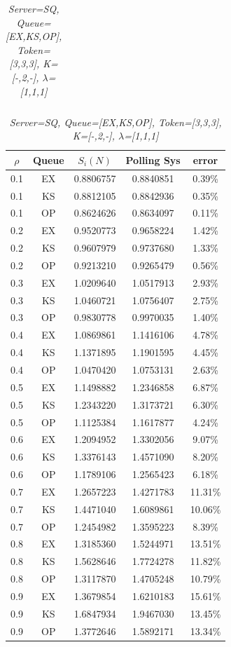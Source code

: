 \documentclass[12pt,a4paper,italian]{article}
\begin{document}
\begin{table}[h!]
\begin{minipage}[b]{0.48\linewidth}
\begin{tabular}{c c c c c}
		\end{tabular}
	\end{minipage}
	\hspace{0.5cm}
	\begin{minipage}[b]{0.48\linewidth}
		\centering
		\caption{\scriptsize \emph{Server=SQ, Queue=[EX,KS,OP], Token=[3,3,3], K=[-,2,-], $\lambda$=[1,1,1]}}
		\label{tab6}
		\tiny
		\begin{tabular}{c c c c c}
			\hline
			$\rho$ & Queue & $S_i(N)$ & Polling Sys & error \\ \hline
		 0.1 & EX & 0.8806757 &   0.8840851    & 0.39\% \\
		 0.1 & KS & 0.8812105 &   0.8842936    & 0.35\% \\
		 0.1 & OP & 0.8624626 &   0.8634097    & 0.11\% \\ \hline \hline
		 0.2 & EX & 0.9520773 &   0.9658224    & 1.42\% \\
		 0.2 & KS & 0.9607979 &   0.9737680    & 1.33\% \\
		 0.2 & OP & 0.9213210 &   0.9265479    & 0.56\% \\ \hline \hline
		 0.3 & EX & 1.0209640 &   1.0517913    & 2.93\% \\
		 0.3 & KS & 1.0460721 &   1.0756407    & 2.75\% \\
		 0.3 & OP & 0.9830778 &   0.9970035    & 1.40\% \\ \hline \hline
		 0.4 & EX & 1.0869861 &   1.1416106    & 4.78\% \\
		 0.4 & KS & 1.1371895 &   1.1901595    & 4.45\% \\
		 0.4 & OP & 1.0470420 &   1.0753131    & 2.63\% \\ \hline \hline
		 0.5 & EX & 1.1498882 &   1.2346858    & 6.87\% \\
		 0.5 & KS & 1.2343220 &   1.3173721    & 6.30\% \\
		 0.5 & OP & 1.1125384 &   1.1617877    & 4.24\% \\ \hline \hline
		 0.6 & EX & 1.2094952 &   1.3302056    & 9.07\% \\
		 0.6 & KS & 1.3376143 &   1.4571090    & 8.20\% \\
		 0.6 & OP & 1.1789106 &   1.2565423    & 6.18\% \\ \hline \hline
		 0.7 & EX & 1.2657223 &   1.4271783    & 11.31\% \\
		 0.7 & KS & 1.4471040 &   1.6089861    & 10.06\% \\
		 0.7 & OP & 1.2454982 &   1.3595223    & 8.39\% \\ \hline \hline
		 0.8 & EX & 1.3185360 &   1.5244971    & 13.51\% \\
		 0.8 & KS & 1.5628646 &   1.7724278    & 11.82\% \\
		 0.8 & OP & 1.3117870 &   1.4705248    & 10.79\% \\ \hline \hline
		 0.9 & EX & 1.3679854 &   1.6210183    & 15.61\% \\
		 0.9 & KS & 1.6847934 &   1.9467030    & 13.45\% \\
		 0.9 & OP & 1.3772646 &   1.5892171    & 13.34\% \\ \hline 


\end{tabular}
\end{minipage}
\end{table}
\end{document}
